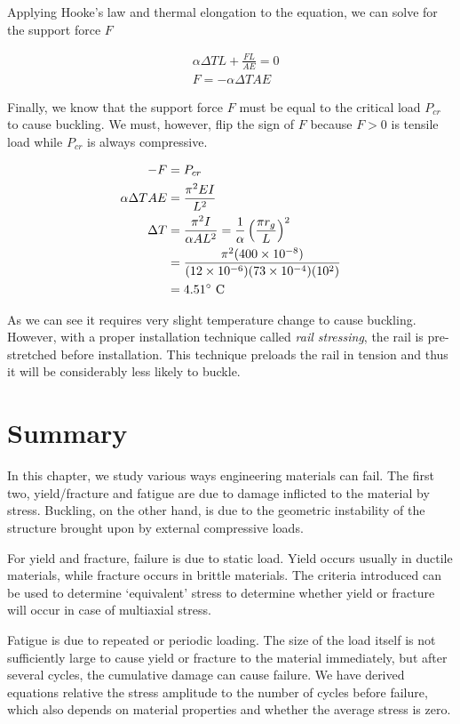 \documentclass[
fontsize=10pt,
a4paper,
twosides=false,
open=any,
svgnames,
]{kaobook} %
\begin{document}
\begin{example}
  Applying Hooke's law and thermal elongation to the equation, we can solve for the support force $F$

  \begin{align*}
    &\alpha \Delta T L + \frac {FL}{AE} = 0 \\
    &F = -\alpha \Delta T A E
  \end{align*}

  Finally, we know that the support force $F$ must be equal to the critical load $P_{cr}$ to cause buckling. We must, however, flip the sign of $F$ because $F > 0$ is tensile load while $P_{cr}$ is always compressive.

  \begin{align*}
    -F &= P_{cr} \\
    \alpha \Delta T A E &= \frac{ \pi^2 EI }{ L^2 } \\
    \Delta T &= \frac{ \pi^2 I }{ \alpha A L^2} = \frac{1}{\alpha} \left( \frac{ \pi r_g }{L} \right)^2 \\
       &= \frac{ \pi^2 (400 \times 10^{-8}) }{ (12 \times 10^{-6})(73 \times 10^{-4})(10^2)}\\
       &= 4.51\degree \text{ C}
  \end{align*}

  As we can see it requires very slight temperature change to cause buckling. However, with a proper installation technique called \emph{rail stressing}, the rail is pre-stretched before installation. This technique preloads the rail in tension and thus it will be considerably less likely to buckle.
\end{example}

\section*{Summary}

In this chapter, we study various ways engineering materials can fail. The first two, yield/fracture and fatigue are due to damage inflicted to the material by stress. Buckling, on the other hand, is due to the geometric instability of the structure brought upon by external compressive loads.

For yield and fracture, failure is due to static load. Yield occurs usually in ductile materials, while fracture occurs in brittle materials. The criteria introduced can be used to determine ‘equivalent’ stress to determine whether yield or fracture will occur in case of multiaxial stress.

Fatigue is due to repeated or periodic loading. The size of the load itself is not sufficiently large to cause yield or fracture to the material immediately, but after several cycles, the cumulative damage can cause failure. We have derived equations relative the stress amplitude to the number of cycles before failure, which also depends on material properties and whether the average stress is zero.
\end{document}
